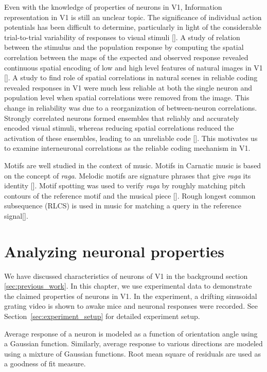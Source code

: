 \documentclass[MTech]{iitmdiss}
\begin{document}
Even with the knowledge of properties of neurons in V1, Information representation in V1 is still an unclear topic. The significance of individual action potentials has been difficult to determine, particularly in light of the considerable trial-to-trial variability of responses to visual stimuli [\cite{reich2000interspike}]. A study of relation between the stimulus and the population response by computing the spatial correlation between the maps of the expected and observed response revealed continuous spatial encoding of low and high level features of natural images in V1 [\cite{ayzenshtat2012population}]. A study to find role of spatial correlations in natural scenes in reliable coding revealed responses in V1 were much less reliable at both the single neuron and population level when spatial correlations were removed from the image. This change in reliability was due to a reorganization of between-neuron correlations. Strongly correlated neurons formed ensembles that reliably and accurately encoded visual stimuli, whereas reducing spatial correlations reduced the activation of these ensembles, leading to an unreliable code [\cite{rikhye2015spatial}]. This motivates us to examine interneuronal correlations as the reliable coding mechanism in V1.

Motifs are well studied in the context of music. Motifs in Carnatic music is based on the concept of \textit{raga}. Melodic motifs are signature phrases that give \textit{raga} its identity [\cite{ishwar2013motif}]. Motif spotting was used to verify \textit{raga} by roughly matching pitch contours of the reference motif and the musical piece [\cite{duttaraga}]. Rough longest common subsequence (RLCS) is used in music for matching a query in the reference signal[\cite{lin2011music}].
\chapter{Analyzing neuronal properties} %
\label{chap:searchmotif}
We have discussed characteristics of neurons of V1 in the background section \ref{sec:previous_work}. In this chapter, we use experimental data to demonstrate the claimed properties of neurons in V1. In the experiment, a drifting sinusoidal grating video is shown to awake mice and neuronal responses were recorded. See Section~\ref{sec:experiment_setup} for detailed experiment setup. 

Average response of a neuron is modeled as a function of orientation angle using a Gaussian function. Similarly, average response to various directions are modeled using a mixture of Gaussian functions. Root mean square of residuals are used as a goodness of fit measure.
\end{document}
